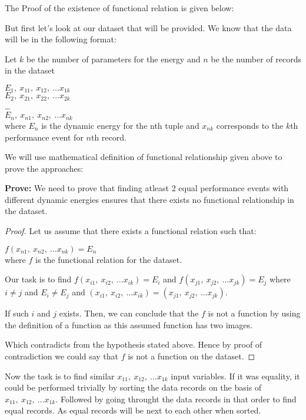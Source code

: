 The Proof of the existence of functional relation is given below:

But first let's look at our dataset that will be provided.
We know that the data will be in the following format:

Let \(k\) be the number of parameters for the energy and \(n\) be the number of records in the dataset

\(E_1,\ x_{11},\ x_{12},\ \ldots x_{1k}\)\\
\(E_2,\ x_{21},\ x_{22},\ \ldots x_{2k}\)\\
\ldots\\
\(E_n,\ x_{n1},\ x_{n2},\ \ldots x_{nk}\)\\
where \(E_n\) is the dynamic energy for the nth tuple and \(x_{nk}\) corresponds to the \(k\)th performance event for \(n\)th record.

We will use mathematical definition of functional relationship given above to prove the approaches:

\textbf{Prove:} We need to prove that finding atleast 2 equal performance events with different dynamic energies ensures that there exists no functional relationship in the dataset.

\begin{proof}
	Let us assume that there exists a functional relation such that:

	\(f(x_{n1},\ x_{n2},\ \ldots x_{nk}) = E_n\)\\
	where \(f\) is the functional relation for the dataset.

	Our task is to find \(f(x_{i1},\ x_{i2},\ \ldots x_{ik}) = E_i\) and \(f(x_{j1},\ x_{j2},\ \ldots x_{jk}) = E_j\)
	where \(i \neq j\) and \(E_i \neq E_j\) and \((x_{i1},\ x_{i2},\ \ldots x_{ik}) = (x_{j1},\ x_{j2},\ \ldots x_{jk})\).

	If such \(i\) and \(j\) exists. Then, we can conclude that the \(f\) is not a function by using the definition of a function as this assumed function has two images.

	Which contradicts from the hypothesis stated above.
	Hence by proof of contradiction we could say that \(f\) is not a function on the dataset.
\end{proof}

Now the task is to find similar \(x_{11},\ x_{12},\ \ldots x_{1k}\) input variables. If it was equality, it could be performed trivially by sorting the data records on the basis of \(x_{11},\ x_{12},\ \ldots x_{1k}\). Followed by going throught the data records in that order to find equal records. As equal records will be next to each other when sorted.

